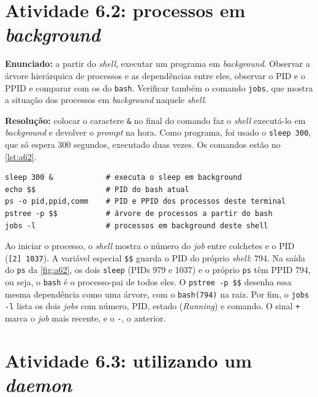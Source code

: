 
\section{Atividade 6.2: processos em \textit{background}}\label{sec:a62}

\textbf{Enunciado:} a partir do \textit{shell}, executar um programa em \textit{background}.
Observar a árvore hierárquica de processos e as dependências entre eles, observar o PID e o
PPID e comparar com os do \texttt{bash}. Verificar também o comando \texttt{jobs}, que mostra a
situação dos processos em \textit{background} naquele \textit{shell}.

\textbf{Resolução:} colocar o caractere \texttt{\&} no final do comando faz o \textit{shell}
executá-lo em \textit{background} e devolver o \textit{prompt} na hora. Como programa, foi usado
o \texttt{sleep 300}, que só espera 300 segundos, executado duas vezes. Os comandos estão no
\autoref{lst:a62}.

\begin{lstlisting}[caption={Atividade 6.2: processos em \textit{background}},label={lst:a62}]
sleep 300 &            # executa o sleep em background
echo $$                # PID do bash atual
ps -o pid,ppid,comm    # PID e PPID dos processos deste terminal
pstree -p $$           # árvore de processos a partir do bash
jobs -l                # processos em background deste shell
\end{lstlisting}

Ao iniciar o processo, o \textit{shell} mostra o número do \textit{job} entre colchetes e o PID
(\texttt{[2] 1037}). A variável especial \texttt{\$\$} guarda o PID do próprio \textit{shell}:
794. Na saída do \texttt{ps} da \autoref{fig:a62}, os dois \texttt{sleep} (PIDs 979 e 1037) e
o próprio \texttt{ps} têm PPID 794, ou seja, o \texttt{bash} é o processo-pai de todos eles. O
\texttt{pstree -p \$\$} desenha essa mesma dependência como uma árvore, com o \texttt{bash(794)}
na raiz. Por fim, o \texttt{jobs -l} lista os dois \textit{jobs} com número, PID, estado
(\textit{Running}) e comando. O sinal \texttt{+} marca o \textit{job} mais recente, e o
\texttt{-}, o anterior.


\section{Atividade 6.3: utilizando um \textit{daemon}}\label{sec:a63}

